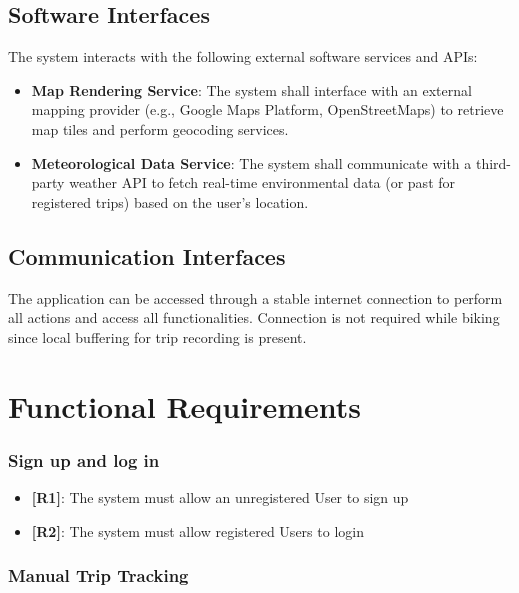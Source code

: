 \subsection{Software Interfaces}

The system interacts with the following external software services and APIs:

\begin{itemize}
    \item \textbf{Map Rendering Service}: The system shall interface with an external mapping provider (e.g., Google Maps Platform, OpenStreetMaps) to retrieve map tiles and perform geocoding services.

    \item \textbf{Meteorological Data Service}: The system shall communicate with a third-party weather API to fetch real-time environmental data (or past for registered trips) based on the user's location.
\end{itemize}

\subsection{Communication Interfaces}

The application can be accessed through a stable internet connection to perform all actions and access all functionalities. Connection is not required while biking since local buffering for trip recording is present.

\section{Functional Requirements}
\label{sec:functional}

\subsubsection{Sign up and log in}

\begin{itemize}
    \item \textbf{[R1]}: The system must allow an unregistered User to sign up
    \item \textbf{[R2]}: The system must allow registered Users to login
\end{itemize}

\subsubsection{Manual Trip Tracking}

